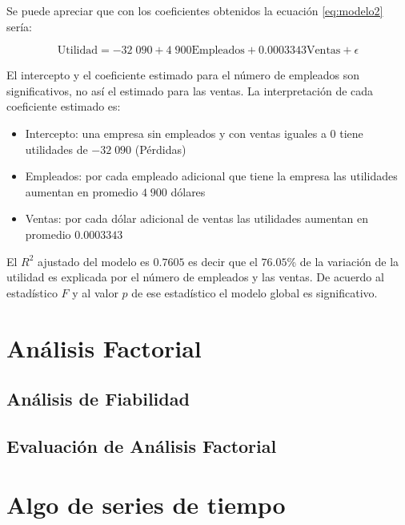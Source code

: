 \documentclass[]{book}
\providecommand{\tightlist}{%
  \setlength{\itemsep}{0pt}\setlength{\parskip}{0pt}}
\begin{document}
Se puede apreciar que con los coeficientes obtenidos la ecuación \eqref{eq:modelo2} sería:

\begin{equation}
  \text{Utilidad} = -32\;090 + 4\;900 \text{Empleados} + 0.0003343 \text{Ventas} + \epsilon
    \label{eq:modelo3}
\end{equation}

El intercepto y el coeficiente estimado para el número de empleados son significativos, no así el estimado para las ventas. La interpretación de cada coeficiente estimado es:

\begin{itemize}
\tightlist
\item
  Intercepto: una empresa sin empleados y con ventas iguales a 0 tiene utilidades de \(-32\;090\) (Pérdidas)
\item
  Empleados: por cada empleado adicional que tiene la empresa las utilidades aumentan en promedio \(4\;900\) dólares
\item
  Ventas: por cada dólar adicional de ventas las utilidades aumentan en promedio \(0.0003343\)
\end{itemize}

El \(R^2\) ajustado del modelo es \(0.7605\) es decir que el \(76.05\)\% de la variación de la utilidad es explicada por el número de empleados y las ventas. De acuerdo al estadístico \(F\) y al valor \(p\) de ese estadístico el modelo global es significativo.

\hypertarget{analisis-factorial}{%
\chapter{Análisis Factorial}\label{analisis-factorial}}

\hypertarget{analisis-de-fiabilidad}{%
\section{Análisis de Fiabilidad}\label{analisis-de-fiabilidad}}

\hypertarget{evaluacion-de-analisis-factorial}{%
\section{Evaluación de Análisis Factorial}\label{evaluacion-de-analisis-factorial}}

\hypertarget{algo-de-series-de-tiempo}{%
\chapter{Algo de series de tiempo}\label{algo-de-series-de-tiempo}}


\end{document}
